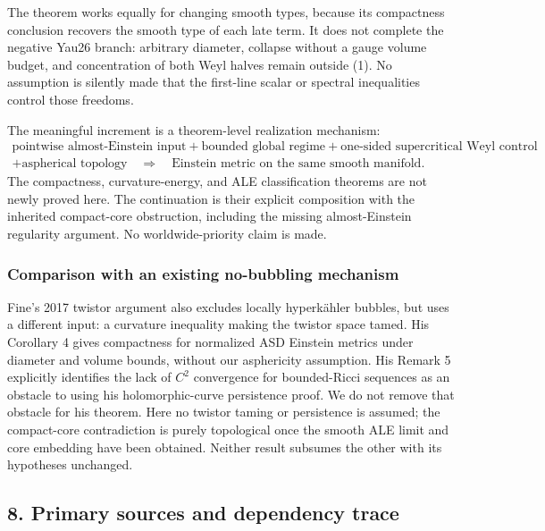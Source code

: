 \documentclass[
  11pt,
]{article}
\begin{document}
The theorem works equally for changing smooth types, because its
compactness conclusion recovers the smooth type of each late term. It
does not complete the negative Yau26 branch: arbitrary diameter,
collapse without a gauge volume budget, and concentration of both Weyl
halves remain outside (1). No assumption is silently made that the
first-line scalar or spectral inequalities control those freedoms.

The meaningful increment is a theorem-level realization mechanism: \[
 \boxed{
 \begin{gathered}
 \text{pointwise almost-Einstein input}
 +\text{bounded global regime}
 +\text{one-sided supercritical Weyl control}\\
 +\text{aspherical topology}
 \quad\Longrightarrow\quad
 \text{Einstein metric on the same smooth manifold}.
 \end{gathered}}
\] The compactness, curvature-energy, and ALE classification theorems
are not newly proved here. The continuation is their explicit
composition with the inherited compact-core obstruction, including the
missing almost-Einstein regularity argument. No worldwide-priority claim
is made.

\hypertarget{comparison-with-an-existing-no-bubbling-mechanism}{%
\subsubsection{Comparison with an existing no-bubbling
mechanism}\label{comparison-with-an-existing-no-bubbling-mechanism}}

Fine's 2017 twistor argument also excludes locally hyperkähler bubbles,
but uses a different input: a curvature inequality making the twistor
space tamed. His Corollary 4 gives compactness for normalized ASD
Einstein metrics under diameter and volume bounds, without our
asphericity assumption. His Remark 5 explicitly identifies the lack of
\(C^2\) convergence for bounded-Ricci sequences as an obstacle to using
his holomorphic-curve persistence proof. We do not remove that obstacle
for his theorem. Here no twistor taming or persistence is assumed; the
compact-core contradiction is purely topological once the smooth ALE
limit and core embedding have been obtained. Neither result subsumes the
other with its hypotheses unchanged.

\hypertarget{primary-sources-and-dependency-trace}{%
\subsection{8. Primary sources and dependency
trace}\label{primary-sources-and-dependency-trace}}
\end{document}
